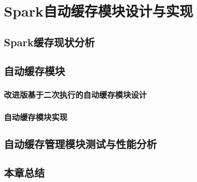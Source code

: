 \chapter{Spark自动缓存模块设计与实现}\label{chap:guide}

\section{Spark缓存现状分析}



\section{自动缓存模块}
\subsection{改进版基于二次执行的自动缓存模块设计}
\subsection{自动缓存模块实现}
\section{自动缓存管理模块测试与性能分析}
\section{本章总结}


